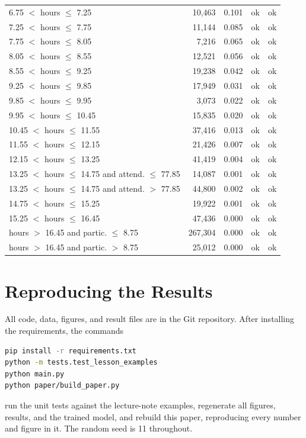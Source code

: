 \documentclass[12pt,a4paper]{article}
\theoremstyle{definition}
\begin{document}
\begin{longtable}{p{7.3cm}rrcc}
6.75 $<$ hours $\leq$ 7.25 & 10{,}463 & 0.101 & ok & ok \\
7.25 $<$ hours $\leq$ 7.75 & 11{,}144 & 0.085 & ok & ok \\
7.75 $<$ hours $\leq$ 8.05 & 7{,}216 & 0.065 & ok & ok \\
8.05 $<$ hours $\leq$ 8.55 & 12{,}521 & 0.056 & ok & ok \\
8.55 $<$ hours $\leq$ 9.25 & 19{,}238 & 0.042 & ok & ok \\
9.25 $<$ hours $\leq$ 9.85 & 17{,}949 & 0.031 & ok & ok \\
9.85 $<$ hours $\leq$ 9.95 & 3{,}073 & 0.022 & ok & ok \\
9.95 $<$ hours $\leq$ 10.45 & 15{,}835 & 0.020 & ok & ok \\
10.45 $<$ hours $\leq$ 11.55 & 37{,}416 & 0.013 & ok & ok \\
11.55 $<$ hours $\leq$ 12.15 & 21{,}426 & 0.007 & ok & ok \\
12.15 $<$ hours $\leq$ 13.25 & 41{,}419 & 0.004 & ok & ok \\
13.25 $<$ hours $\leq$ 14.75 and attend. $\leq$ 77.85 & 14{,}087 & 0.001 & ok & ok \\
13.25 $<$ hours $\leq$ 14.75 and attend. $>$ 77.85 & 44{,}800 & 0.002 & ok & ok \\
14.75 $<$ hours $\leq$ 15.25 & 19{,}922 & 0.001 & ok & ok \\
15.25 $<$ hours $\leq$ 16.45 & 47{,}436 & 0.000 & ok & ok \\
hours $>$ 16.45 and partic. $\leq$ 8.75 & 267{,}304 & 0.000 & ok & ok \\
hours $>$ 16.45 and partic. $>$ 8.75 & 25{,}012 & 0.000 & ok & ok \\
\bottomrule
\end{longtable}

\endgroup

\section{Reproducing the Results}

All code, data, figures, and result files are in the Git repository. After installing the requirements, the commands

\begin{lstlisting}[language=bash]
pip install -r requirements.txt
python -m tests.test_lesson_examples
python main.py
python paper/build_paper.py
\end{lstlisting}

run the unit tests against the lecture-note examples, regenerate all figures, results, and the trained model, and rebuild this paper, reproducing every number and figure in it. The random seed is 11 throughout.
\end{document}
